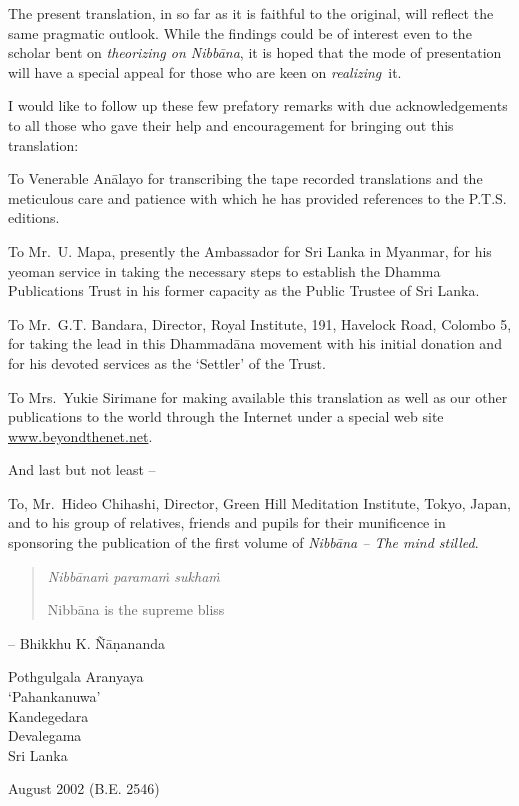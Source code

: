 The present translation, in so far as it is faithful to the original, will reflect the same pragmatic outlook. While the findings could be of interest even to the scholar bent on \emph{theorizing on Nibbāna}, it is hoped that the mode of presentation will have a special appeal for those who are keen on \emph{realizing}~it.

I would like to follow up these few prefatory remarks with due acknowledgements to all those who gave their help and encouragement for bringing out this translation:

To Venerable Anālayo for transcribing the tape recorded translations and the meticulous care and patience with which he has provided references to the P.T.S. editions.

To Mr.~U. Mapa, presently the Ambassador for Sri Lanka in Myanmar, for his yeoman service in taking the necessary steps to establish the Dhamma Publications Trust in his former capacity as the Public Trustee of Sri Lanka.

To Mr.~G.T. Bandara, Director, Royal Institute, 191, Havelock Road, Colombo 5, for taking the lead in this Dhammadāna movement with his initial donation and for his devoted services as the `Settler' of the Trust.

To Mrs.~Yukie Sirimane for making available this translation as well as our other publications to the world through the Internet under a special web site \href{https://beyondthenet.net/}{www.beyondthenet.net}.

\clearpage

And last but not least --

To, Mr.~Hideo Chihashi, Director, Green Hill Meditation Institute, Tokyo, Japan, and to his group of relatives, friends and pupils for their munificence in sponsoring the publication of the first volume of \emph{Nibbāna -- The mind stilled}.

\begin{quote}
\emph{Nibbānaṁ paramaṁ sukhaṁ}

Nibbāna is the supreme bliss
\end{quote}

-- Bhikkhu K. Ñāṇananda

Pothgulgala Aranyaya\\
`Pahankanuwa'\\
Kandegedara\\
Devalegama\\
Sri Lanka

August 2002 (B.E. 2546)

